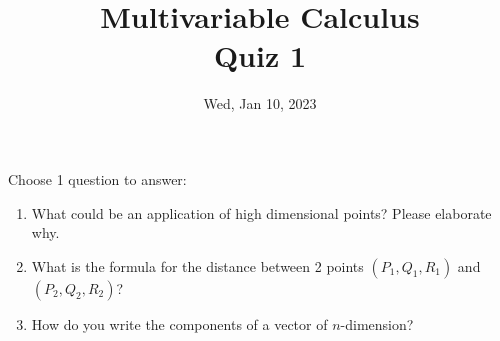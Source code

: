 \documentclass[aspectratio=169]{beamer}
\title{ Multivariable Calculus \\ Quiz 1}
\institute{Fulbright University Vietnam}
\date{Wed, Jan 10, 2023}
\begin{document}
\maketitle

\begin{frame}
    Choose 1 question to answer:
    \begin{enumerate}
        \item What could be an application of high dimensional points? Please elaborate why.
        \item What is the formula for the distance between 2 points $(P_1, Q_1, R_1)$ and
            $(P_2, Q_2, R_2)$?
        \item How do you write the components of a vector of $n$-dimension?
    \end{enumerate}
\end{frame}
\end{document}
